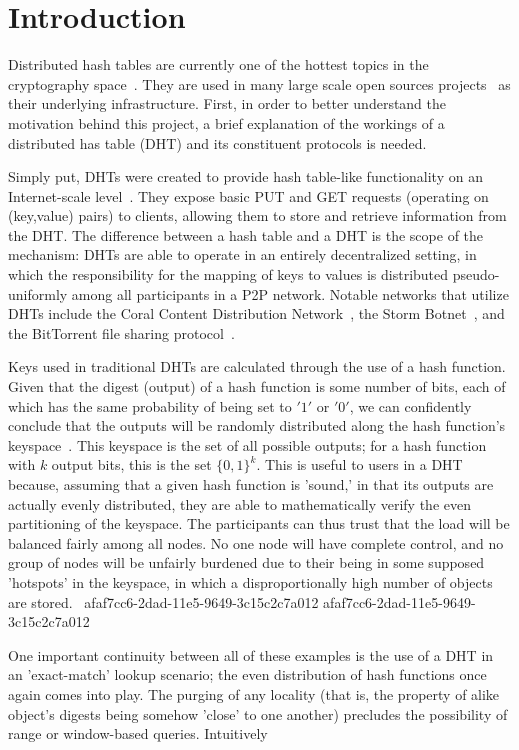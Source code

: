\documentclass[12pt]{article}
\begin{document}
\section{Introduction}
\par Distributed hash tables are currently one of the hottest topics in the cryptography space~\cite{Stoica:2001dj,Rowstron:2001ea,Ratnasamy:2001wn}. They are used in many large scale open sources projects~\cite{Freitas:2013tb,Xu:2010vs,Perfitt:2010fh} as their underlying infrastructure. First, in order to better understand the motivation behind this project, a brief explanation of the workings of a distributed has table (DHT) and its constituent protocols is needed.

\par Simply put, DHTs were created to provide hash table-like functionality on an Internet-scale level~\cite{Ratnasamy:2001wn}. They expose basic PUT and GET requests (operating on (key,value) pairs) to clients, allowing them to store and retrieve information from the DHT. The difference between a hash table and a DHT is the scope of the mechanism: DHTs are able to operate in an entirely decentralized setting, in which the responsibility for the mapping of keys to values is distributed pseudo-uniformly among all participants in a P2P network. Notable networks that utilize DHTs include the Coral Content Distribution Network~\cite{Freedman:2004vb}, the Storm Botnet~\cite{Holz:2008uk}, and the BitTorrent file sharing protocol~\cite{Cohen:y1_8mBnw}.

\par Keys used in traditional DHTs are calculated through the use of a hash function. Given that the digest (output) of a hash function is some number of bits, each of which has the same probability of being set to $'1'$ or $'0'$, we can confidently conclude that the outputs will be randomly distributed along the hash function's keyspace~. This keyspace is the set of all possible outputs; for a hash function with $k$ output bits, this is the set $\{0,1\}^k$. This is useful to users in a DHT because, assuming that a given hash function is 'sound,' in that its outputs are actually evenly distributed, they are able to mathematically verify the even partitioning of the keyspace. The participants can thus trust that the load will be balanced fairly among all nodes. No one node will have complete control, and no group of nodes will be unfairly burdened due to their being in some supposed 'hotspots' in the keyspace, in which a disproportionally high number of objects are stored.~
afaf7cc6-2dad-11e5-9649-3c15c2c7a012
afaf7cc6-2dad-11e5-9649-3c15c2c7a012\par One important continuity between all of these examples is the use of a DHT in an 'exact-match' lookup scenario; the even distribution of hash functions once again comes into play. The purging of any locality (that is, the property of alike object's digests being somehow 'close' to one another) precludes the possibility of range or window-based queries. Intuitively
\end{document}
